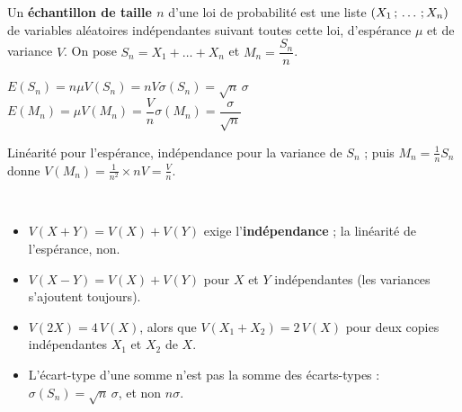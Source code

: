 
\begin{definition}[Échantillon]
Un \textbf{échantillon de taille $n$} d'une loi de probabilité est une liste $(X_1\,{;}\,\dots\,{;}\, X_n)$ de variables aléatoires
indépendantes suivant toutes cette loi, d'espérance $\mu$ et de variance $V$. On pose $S_n=X_1+\dots+X_n$ et $M_n=\dfrac{S_n}{n}$.
\end{definition}

\noindent
\begin{minipage}[c]{0.56\linewidth}
\begin{theoreme}
\raggedright
$E(S_n)=n\mu$\qquad $V(S_n)=nV$\qquad $\sigma(S_n)=\sqrt n\,\sigma$\\[1.5mm]
$E(M_n)=\mu$\qquad $V(M_n)=\dfrac Vn$\qquad $\sigma(M_n)=\dfrac{\sigma}{\sqrt n}$
\end{theoreme}
\begin{demonstration}
\raggedright
Linéarité pour l'espérance, indépendance pour la variance de $S_n$ ; puis $M_n=\frac1nS_n$ donne $V(M_n)=\frac{1}{n^{2}}\times nV=\frac Vn$.
\end{demonstration}
\end{minipage}\hfill
\begin{minipage}[c]{0.4\linewidth}
\centering
{}\\[0.5mm]
\end{minipage}

\begin{attention}
\begin{itemize}[label={\color{otOrange}\textbullet},leftmargin=1.4em,itemsep=0.6mm,topsep=0.5mm]
  \item $V(X+Y)=V(X)+V(Y)$ exige l'\textbf{indépendance} ; la linéarité de l'espérance, non.
  \item $V(X-Y)=V(X)+V(Y)$ pour $X$ et $Y$ indépendantes (les variances s'ajoutent toujours).
  \item $V(2X)=4\,V(X)$, alors que $V(X_1+X_2)=2\,V(X)$ pour deux copies indépendantes $X_1$ et $X_2$ de $X$.
  \item L'écart-type d'une somme n'est pas la somme des écarts-types : $\sigma(S_n)=\sqrt n\,\sigma$, et non $n\sigma$.
\end{itemize}
\end{attention}

